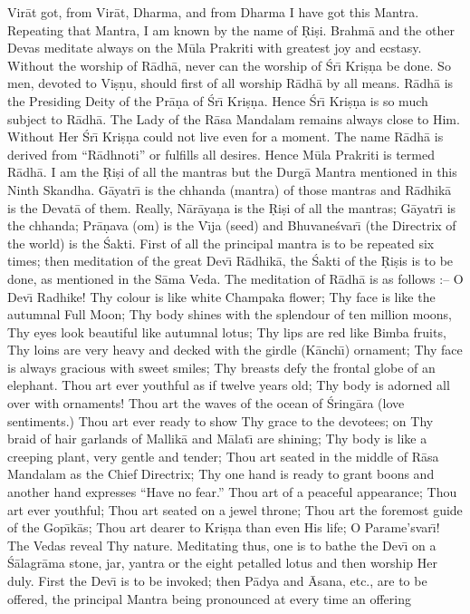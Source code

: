 Vir\=at got, from Vir\=at, Dharma, and from Dharma I have got this Mantra. Repeating that Mantra, I am known by the name of \d{R}i\d{s}i. Brahm\=a and the other Devas meditate always on the M\=ula Prakriti with greatest joy and ecstasy. Without the worship of R\=adh\=a, never can the worship of \'Sr\={\i} Kri\d{s}\d{n}a be done. So men, devoted to Vi\d{s}\d{n}u, should first of all worship R\=adh\=a by all means. R\=adh\=a is the Presiding Deity of the Pr\=a\d{n}a of \'Sr\={\i} Kri\d{s}\d{n}a. Hence \'Sr\={\i} Kri\d{s}\d{n}a is so much subject to R\=adh\=a. The Lady of the R\=asa Mandalam remains always close to Him. Without Her \'Sr\={\i} Kri\d{s}\d{n}a could not live even for a moment. The name R\=adh\=a is derived from ``R\=adhnoti'' or fulfills all desires. Hence M\=ula Prakriti is termed R\=adh\=a. I am the \d{R}i\d{s}i of all the mantras but the Durg\=a Mantra mentioned in this Ninth Skandha. G\=ayatr\={\i} is the chhanda (mantra) of those mantras and R\=adhik\=a is the Devat\=a of them. Really, N\=ar\=aya\d{n}a is the \d{R}i\d{s}i of all the mantras; G\=ayatr\={\i} is the chhanda; Pr\=a\d{n}ava (om) is the V\={\i}ja (seed) and Bhuvane\'svar\={\i} (the Directrix of the world) is the \'Sakti. First of all the principal mantra is to be repeated six times; then meditation of the great Dev\={\i} R\=adhik\=a, the \'Sakti of the \d{R}i\d{s}is is to be done, as mentioned in the S\=ama Veda. The meditation of R\=adh\=a is as follows :-- O Dev\={\i} Radhike! Thy colour is like white Champaka flower; Thy face is like the autumnal Full Moon; Thy body shines with the splendour of ten million moons, Thy eyes look beautiful like autumnal lotus; Thy lips are red like Bimba fruits, Thy loins are very heavy and decked with the girdle (K\=anch\={\i}) ornament; Thy face is always gracious with sweet smiles; Thy breasts defy the frontal globe of an elephant. Thou art ever youthful as if twelve years old; Thy body is adorned all over with ornaments! Thou art the waves of the ocean of \'Sring\=ara (love sentiments.) Thou art ever ready to show Thy grace to the devotees; on Thy braid of hair garlands of Mallik\=a and M\=alat\={\i} are shining; Thy body is like a creeping plant, very gentle and tender; Thou art seated in the middle of R\=asa Mandalam as the Chief Directrix; Thy one hand is ready to grant boons and another hand expresses ``Have no fear.'' Thou art of a peaceful appearance; Thou art ever youthful; Thou art seated on a jewel throne; Thou art the foremost guide of the Gop\={\i}k\=as; Thou art dearer to Kri\d{s}\d{n}a than even His life; O Parame'svar\={\i}! The Vedas reveal Thy nature. Meditating thus, one is to bathe the Dev\={\i} on a \'S\=alagr\=ama stone, jar, yantra or the eight petalled lotus and then worship Her duly. First the Dev\={\i} is to be invoked; then P\=adya and \=Asana, etc., are to be offered, the principal Mantra being pronounced at every time an offering

